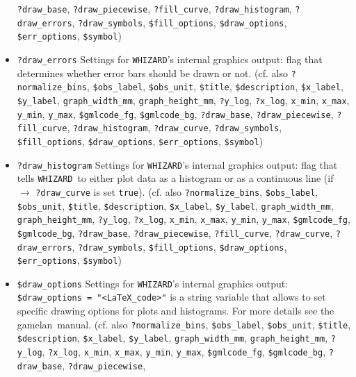 \documentclass[12pt]{book}
\newcommand{\ttt}[1]{\texttt{#1}}
\newcommand{\whizard}{\texttt{WHIZARD}}
\newcommand{\gamelan}{\textsf{gamelan}}
\begin{document}
\begin{itemize}
\ttt{?draw\_base}, \ttt{?draw\_piecewise},
\ttt{?fill\_curve}, \ttt{?draw\_histogram}, \ttt{?draw\_errors},
\ttt{?draw\_symbols}, \ttt{\$fill\_options}, \ttt{\$draw\_options},
\ttt{\$err\_options}, \ttt{\$symbol})
\item
\ttt{?draw\_errors} \newline
Settings for \whizard's internal graphics output: flag that determines
whether error bars should be drawn or not. (cf. also
\ttt{?normalize\_bins}, \ttt{\$obs\_label}, \ttt{\$obs\_unit}, 
\ttt{\$title}, \ttt{\$description}, \ttt{\$x\_label},
\ttt{\$y\_label}, \ttt{graph\_width\_mm}, \ttt{graph\_height\_mm},
\ttt{?y\_log}, \ttt{?x\_log}, \ttt{x\_min}, \ttt{x\_max}, 
\ttt{y\_min}, \ttt{y\_max}, \ttt{\$gmlcode\_fg}, \ttt{\$gmlcode\_bg},
\ttt{?draw\_base}, \ttt{?draw\_piecewise},
\ttt{?fill\_curve}, \ttt{?draw\_histogram}, \ttt{?draw\_curve},
\ttt{?draw\_symbols}, \ttt{\$fill\_options}, \newline 
\ttt{\$draw\_options}, \ttt{\$err\_options}, \ttt{\$symbol})
\item
\ttt{?draw\_histogram} \newline
Settings for \whizard's internal graphics output: flag that tells
\whizard\ to either plot data as a histogram or as a continuous
line (if $\to$ \ttt{?draw\_curve} is set \ttt{true}). (cf. also
\ttt{?normalize\_bins}, \ttt{\$obs\_label}, \ttt{\$obs\_unit}, 
\ttt{\$title}, \ttt{\$description}, \ttt{\$x\_label},
\ttt{\$y\_label}, \ttt{graph\_width\_mm}, \ttt{graph\_height\_mm},
\ttt{?y\_log}, \ttt{?x\_log}, \ttt{x\_min}, \ttt{x\_max}, 
\ttt{y\_min}, \ttt{y\_max}, \newline \ttt{\$gmlcode\_fg}, \ttt{\$gmlcode\_bg},
\ttt{?draw\_base}, \ttt{?draw\_piecewise},
\ttt{?fill\_curve}, \ttt{?draw\_curve}, \ttt{?draw\_errors},
\ttt{?draw\_symbols}, \ttt{\$fill\_options}, \ttt{\$draw\_options},
\ttt{\$err\_options}, \ttt{\$symbol})
\item
\ttt{\$draw\_options} \newline
Settings for \whizard's internal graphics output: \ttt{\$draw\_options
= "<LaTeX\_code>"} is a string variable that allows to set specific
drawing options for plots and histograms. For more details see the
\gamelan\ manual. (cf. also
\ttt{?normalize\_bins}, \ttt{\$obs\_label}, \ttt{\$obs\_unit}, 
\ttt{\$title}, \ttt{\$description}, \ttt{\$x\_label},
\ttt{\$y\_label}, \ttt{graph\_width\_mm}, \ttt{graph\_height\_mm},
\ttt{?y\_log}, \ttt{?x\_log}, \ttt{x\_min}, \ttt{x\_max}, 
\ttt{y\_min}, \ttt{y\_max}, \ttt{\$gmlcode\_fg}, \ttt{\$gmlcode\_bg},
\ttt{?draw\_base}, \newline \ttt{?draw\_piecewise},

\end{itemize}
\end{document}
